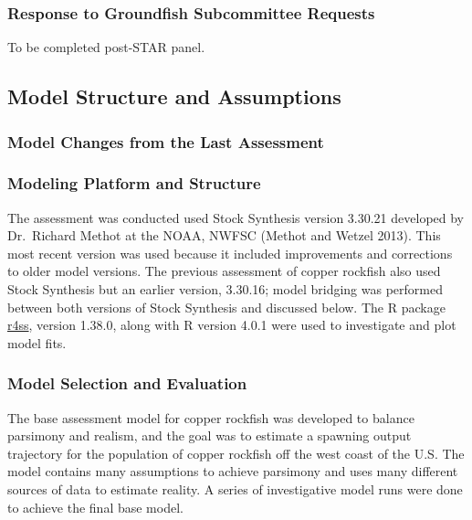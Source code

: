 \documentclass[11pt,
  english,
  letterpaper,
]{article}
\begin{document}
\hypertarget{response-to-groundfish-subcommittee-requests}{%
\subsubsection{Response to Groundfish Subcommittee Requests}\label{response-to-groundfish-subcommittee-requests}}

To be completed post-STAR panel.

\hypertarget{model-structure-and-assumptions}{%
\subsection{Model Structure and Assumptions}\label{model-structure-and-assumptions}}

\hypertarget{model-changes-from-the-last-assessment}{%
\subsubsection{Model Changes from the Last Assessment}\label{model-changes-from-the-last-assessment}}

\hypertarget{modeling-platform-and-structure}{%
\subsubsection{Modeling Platform and Structure}\label{modeling-platform-and-structure}}

The assessment was conducted used Stock Synthesis version 3.30.21 developed by Dr.~Richard Methot at the NOAA, NWFSC (Methot and Wetzel 2013). This most recent version was used because it included improvements and corrections to older model versions. The previous assessment of copper rockfish also used Stock Synthesis but an earlier version, 3.30.16; model bridging was performed between both versions of Stock Synthesis and discussed below. The R package \href{https://github.com/r4ss/r4ss}{r4ss}, version 1.38.0, along with R version 4.0.1 were used to investigate and plot model fits.

\hypertarget{model-selection-and-evaluation}{%
\subsubsection{Model Selection and Evaluation}\label{model-selection-and-evaluation}}

The base assessment model for copper rockfish was developed to balance parsimony and realism, and the goal was to estimate a spawning output trajectory for the population of copper rockfish off the west coast of the U.S. The model contains many assumptions to achieve parsimony and uses many different sources of data to estimate reality. A series of investigative model runs were done to achieve the final base model.
\end{document}
